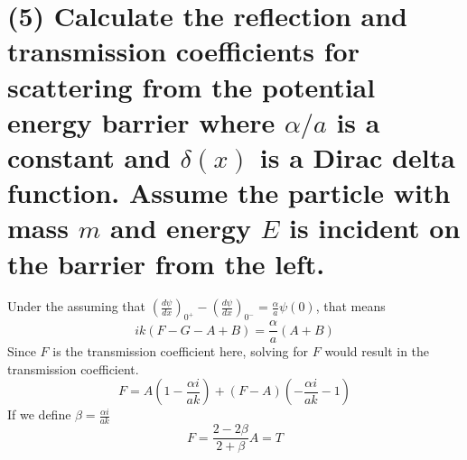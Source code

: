 \documentclass[10pt,letterpaper]{article}
\begin{document}
\section*{(5) Calculate the reflection and transmission coefficients for scattering from the potential energy barrier where $\alpha/a$ is a constant and $\delta(x)$ is a Dirac delta function. Assume the particle with mass $m$ and energy $E$ is incident on the barrier from the left.}
Under the assuming that $\left(\frac{d\psi}{dx}\right)_{0^{+}} - \left(\frac{d\psi}{dx}\right)_{0^{-}} = \frac{\alpha}{a}\psi(0)$, that means 
$$ik(F - G - A + B) = \frac{\alpha}{a}(A + B)$$
Since $F$ is the transmission coefficient here, solving for $F$ would result in the transmission coefficient. 
$$F = A\left(1 - \frac{\alpha i}{ak}\right) + (F - A)\left(-\frac{\alpha i}{ak} - 1\right)$$
If we define $\beta = \frac{\alpha i}{ak}$
$$F = \frac{2 - 2\beta}{2 + \beta}A = T$$
\end{document}
